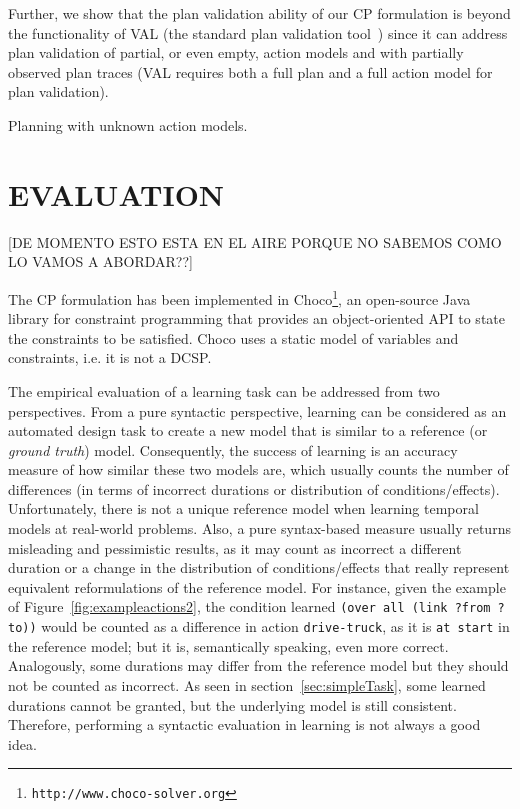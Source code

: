 \documentclass{ecai}
\begin{document}
Further, we show that the plan validation ability of our CP formulation is beyond the functionality of VAL (the standard plan validation tool~\cite{howey2004val}) since it can address plan validation of partial, or even empty, action models and with partially observed plan traces (VAL requires both a full plan and a full action model for plan validation).

Planning with unknown action models.




  
\section{EVALUATION}
\label{sec:evaluation}

[DE MOMENTO ESTO ESTA EN EL AIRE PORQUE NO SABEMOS COMO LO VAMOS A ABORDAR??]

The CP formulation has been implemented in \textsf{Choco}\footnote{\texttt{http://www.choco-solver.org}}, an open-source Java library for constraint programming that provides an object-oriented API to state the constraints to be satisfied. \textsf{Choco} uses a static model of variables and constraints, i.e. it is not a DCSP.

The empirical evaluation of a learning task can be addressed from two perspectives. From a pure syntactic perspective, learning can be considered as an automated design task to create a new model that is similar to a reference (or {\em ground truth}) model. Consequently, the success of learning is an accuracy measure of how similar these two models are, which usually counts the number of differences (in terms of incorrect durations or distribution of conditions/effects). Unfortunately, there is not a unique reference model when learning temporal models at real-world problems. Also, a pure syntax-based measure usually returns misleading and pessimistic results, as it may count as incorrect a different duration or a change in the distribution of conditions/effects that really represent equivalent reformulations of the reference model. For instance, given the example of Figure~\ref{fig:exampleactions2}, the condition learned \texttt{(over all (link ?from ?to))} would be counted as a difference in action \texttt{drive-truck}, as it is \texttt{at start} in the reference model; but it is, semantically speaking, even more correct. Analogously, some durations may differ from the reference model but they should not be counted as incorrect. As seen in section~\ref{sec:simpleTask}, some learned durations cannot be granted, but the underlying model is still consistent. Therefore, performing a syntactic evaluation in learning is not always a good idea.
\end{document}
